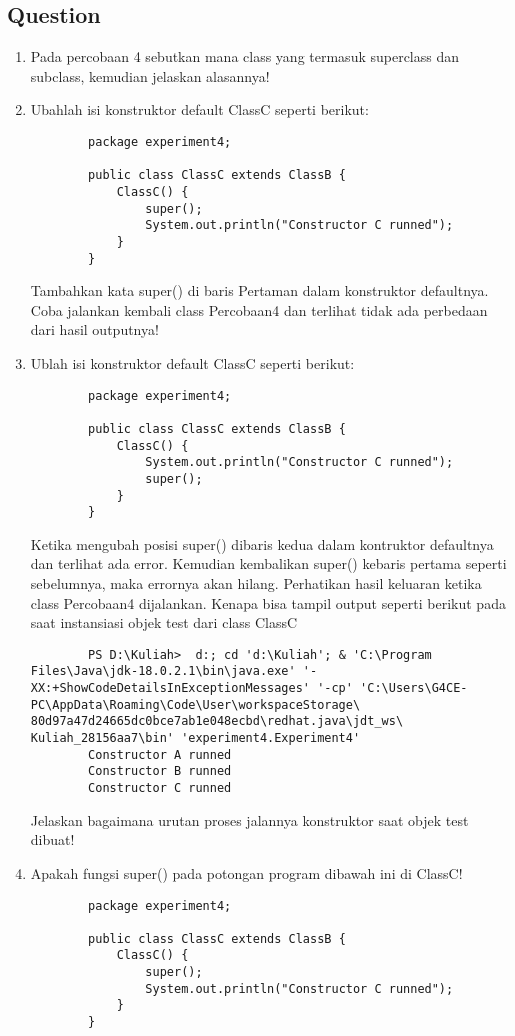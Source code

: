 \documentclass[12pt,titlepage]{article}
\begin{document}
\subsection{Question}
\begin{enumerate}
    \item Pada percobaan 4 sebutkan mana class yang termasuk superclass dan subclass, kemudian jelaskan alasannya!
    \item Ubahlah isi konstruktor default ClassC seperti berikut:
    \begin{verbatim}
        package experiment4;

        public class ClassC extends ClassB {
            ClassC() {
                super();
                System.out.println("Constructor C runned");
            }
        }
    \end{verbatim}
    Tambahkan kata super() di baris Pertaman dalam konstruktor defaultnya. Coba jalankan kembali class Percobaan4 dan terlihat tidak ada perbedaan dari hasil outputnya!
    \newpage
    \item Ublah isi konstruktor default ClassC seperti berikut:
    \begin{verbatim}
        package experiment4;

        public class ClassC extends ClassB {
            ClassC() {
                System.out.println("Constructor C runned");
                super();
            }
        }
    \end{verbatim}
    Ketika mengubah posisi super() dibaris kedua dalam kontruktor defaultnya dan terlihat ada error. Kemudian kembalikan super() kebaris pertama seperti sebelumnya, maka errornya akan hilang.
    Perhatikan hasil keluaran ketika class Percobaan4 dijalankan. Kenapa bisa tampil output seperti berikut pada saat instansiasi objek test dari class ClassC
    \begin{verbatim}
        PS D:\Kuliah>  d:; cd 'd:\Kuliah'; & 'C:\Program Files\Java\jdk-18.0.2.1\bin\java.exe' '-XX:+ShowCodeDetailsInExceptionMessages' '-cp' 'C:\Users\G4CE-PC\AppData\Roaming\Code\User\workspaceStorage\ 80d97a47d24665dc0bce7ab1e048ecbd\redhat.java\jdt_ws\ Kuliah_28156aa7\bin' 'experiment4.Experiment4'
        Constructor A runned
        Constructor B runned
        Constructor C runned
    \end{verbatim}
    Jelaskan bagaimana urutan proses jalannya konstruktor saat objek test dibuat!
    \item Apakah fungsi super() pada potongan program dibawah ini di ClassC!
    \begin{verbatim}
        package experiment4;

        public class ClassC extends ClassB {
            ClassC() {
                super();
                System.out.println("Constructor C runned");
            }
        }
    \end{verbatim}
\end{enumerate}
\end{document}
